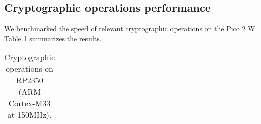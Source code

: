\documentclass[letterpaper,12pt,titlepage,oneside,final]{book}
\begin{document}
\subsection{Cryptographic operations performance}
We benchmarked the speed of relevant cryptographic operations on the Pico 2 W.
Table \ref{tab:pico2w-crypto-speed} summarizes the results.

\begin{table}[p]
\centering
\caption{
    Cryptographic operations on RP2350 (ARM Cortex-M33 at 150MHz).
}
\vspace{1em}
\label{tab:pico2w-crypto-speed}

\footnotesize\begin{tabular}{lrrrrrr}
\toprule

\bottomrule
\end{tabular}\vspace{1em}


\end{table}
\end{document}
